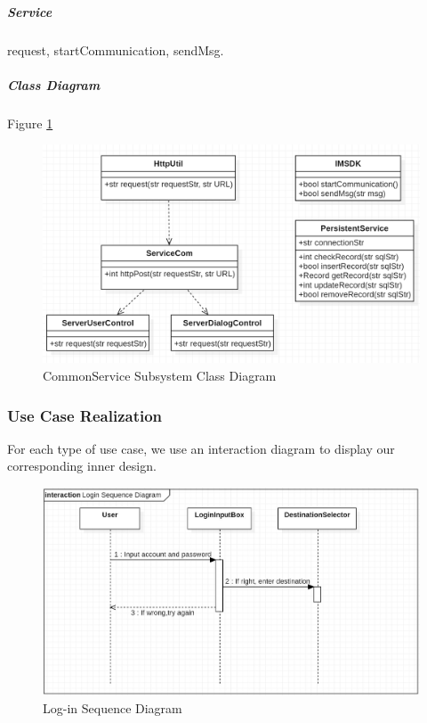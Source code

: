 \documentclass[10pt]{article}
\begin{document}
\subparagraph{Service}  request, startCommunication, sendMsg.

\subparagraph{Class Diagram} Figure \ref{CommonService Subsystem Class Diagram}

\begin{figure}[H]
	\centering
	
	\includegraphics[width=14cm]{commonclass.png}
	\caption{CommonService Subsystem Class Diagram}
	\label{CommonService Subsystem Class Diagram}
\end{figure}

\subsubsection{Use Case Realization}
For each type of use case, we use an interaction diagram to display our corresponding inner design.

\begin{figure}[H]
    \centering
    
    \includegraphics[width=14cm]{login.jpg}
    \caption{Log-in Sequence Diagram}
    \label{Log-in Sequence Diagram}
\end{figure}
\end{document}
